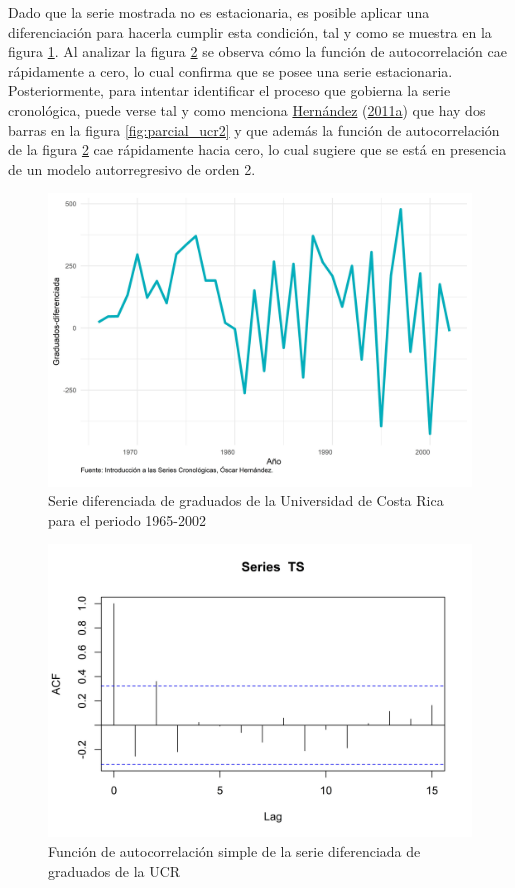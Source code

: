 \documentclass[
]{article}
\begin{document}
Dado que la serie mostrada no es estacionaria, es posible aplicar una
diferenciación para hacerla cumplir esta condición, tal y como se
muestra en la figura \ref{fig:ejemplo_ucr_diferenciada}. Al analizar la
figura \ref{fig:auto_ucr2} se observa cómo la función de autocorrelación
cae rápidamente a cero, lo cual confirma que se posee una serie
estacionaria. Posteriormente, para intentar identificar el proceso que
gobierna la serie cronológica, puede verse tal y como menciona
\protect\hyperlink{ref-oscarh-1}{Hernández}
(\protect\hyperlink{ref-oscarh-1}{2011a}) que hay dos barras en la
figura \ref{fig:parcial_ucr2} y que además la función de autocorrelación
de la figura \ref{fig:auto_ucr2} cae rápidamente hacia cero, lo cual
sugiere que se está en presencia de un modelo autorregresivo de orden 2.

\begin{figure}[!h]
\includegraphics[width=1\linewidth,height=1\textheight]{Tesis_files/figure-latex/ejemplo_ucr_diferenciada-1} \caption{Serie diferenciada de graduados de la Universidad de Costa Rica para el periodo 1965-2002}\label{fig:ejemplo_ucr_diferenciada}
\end{figure}

\begin{figure}[!h]
\includegraphics[width=1\linewidth,height=1\textheight]{Tesis_files/figure-latex/auto_ucr2-1} \caption{Función de autocorrelación simple de la serie diferenciada de graduados de la UCR}\label{fig:auto_ucr2}
\end{figure}
\end{document}
